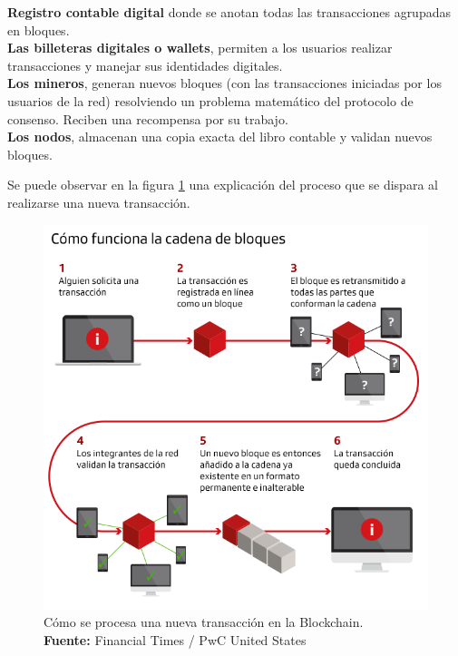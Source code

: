 \documentclass[
11pt, %
oneside, %
spanish, %
singlespacing, %
parskip, %
headsepline, %
chapterinoneline, %
]{MastersDoctoralThesis} %
\begin{document}
\textbf{Registro contable digital} donde se anotan todas las transacciones agrupadas en bloques. \\
\textbf{Las billeteras digitales o wallets}, permiten a los usuarios realizar transacciones y manejar sus identidades digitales. \\
\textbf{Los mineros}, generan nuevos bloques (con las transacciones iniciadas por los usuarios de la red) resolviendo un problema matemático del protocolo de consenso. Reciben una recompensa por su trabajo. \\
\textbf{Los nodos}, almacenan una copia exacta del libro contable y validan nuevos bloques.

Se puede observar en la figura \ref{fig:bc-exp} una explicación del proceso que se dispara al realizarse una nueva transacción. 

\begin{figure}[H]
  	\centering
	\includegraphics[scale=0.5]{imgs/blockchain-explained.png}
	\caption{Cómo se procesa una nueva transacción en la Blockchain. \\ \textbf{Fuente:} Financial Times / PwC United States}
	\label{fig:bc-exp}
\end{figure}
\end{document}
